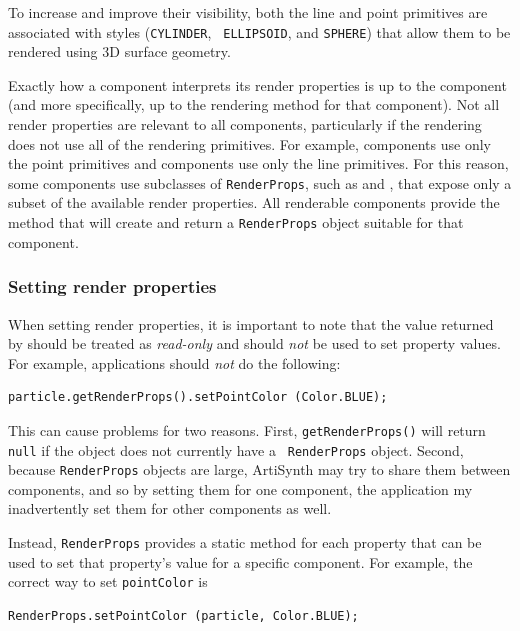To increase and improve their visibility, both the line and point
primitives are associated with styles ({\tt CYLINDER}, {\tt
ELLIPSOID}, and {\tt SPHERE}) that allow them to be rendered using 3D
surface geometry.

Exactly how a component interprets its render properties is up to the
component (and more specifically, up to the rendering method for that
component).  Not all render properties are relevant to all components,
particularly if the rendering does not use all of the rendering
primitives. For example,
 components use only
the point primitives and
 components use only
the line primitives. For this reason, some components use subclasses
of {\tt RenderProps}, such as
 and
, that expose only a subset
of the available render properties. All renderable components provide
the method
 that
will create and return a {\tt RenderProps} object suitable for that
component.

\subsubsection{Setting render properties}
\label{SettingRenderProperties:sec}

When setting render properties, it is important to note that
the value returned by
should be treated as {\it read-only} and should {\it not}
be used to set property values.
For example, applications should {\it not} do the
following:
\begin{lstlisting}[]
   particle.getRenderProps().setPointColor (Color.BLUE);
\end{lstlisting}
%
This can cause problems for two reasons. First, {\tt getRenderProps()}
will return {\tt null} if the object does not currently have a {\tt
RenderProps} object. Second, because {\tt RenderProps} objects are
large, ArtiSynth may try to share them between components, and so by
setting them for one component, the application my inadvertently set
them for other components as well.

Instead, {\tt RenderProps} provides a static method for each property
that can be used to set that property's value for a specific
component.  For example, the correct way to set {\tt pointColor} is
%
\begin{lstlisting}[]
   RenderProps.setPointColor (particle, Color.BLUE);
\end{lstlisting}
%

